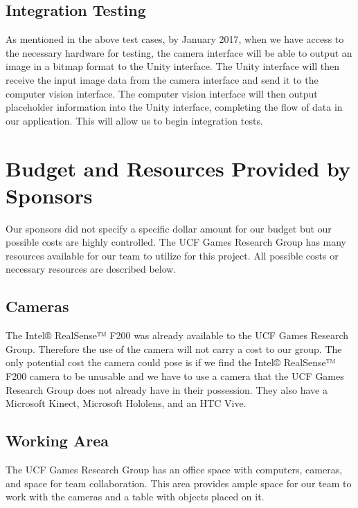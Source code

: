 \documentclass[12pt]{article}
\begin{document}
\subsection{Integration Testing}\label{integration-testing}

As mentioned in the above test cases, by January 2017, when we have
access to the necessary hardware for testing, the camera interface will
be able to output an image in a bitmap format to the Unity interface.
The Unity interface will then receive the input image data from the
camera interface and send it to the computer vision interface. The
computer vision interface will then output placeholder information into
the Unity interface, completing the flow of data in our application.
This will allow us to begin integration tests.

\section{Budget and Resources Provided by
Sponsors}\label{budget-and-resources-provided-by-sponsors}

Our sponsors did not specify a specific dollar amount for our budget but
our possible costs are highly controlled. The UCF Games Research Group
has many resources available for our team to utilize for this project.
All possible costs or necessary resources are described below.

\subsection{Cameras}\label{cameras}

The Intel® RealSense™ F200 was already available to the UCF Games
Research Group. Therefore the use of the camera will not carry a cost to
our group. The only potential cost the camera could pose is if we find
the Intel® RealSense™ F200 camera to be unusable and we have to use a
camera that the UCF Games Research Group does not already have in their
possession. They also have a Microsoft Kinect, Microsoft Hololens, and
an HTC Vive.

\subsection{Working Area}\label{working-area}

The UCF Games Research Group has an office space with computers,
cameras, and space for team collaboration. This area provides ample
space for our team to work with the cameras and a table with objects
placed on it.
\end{document}
